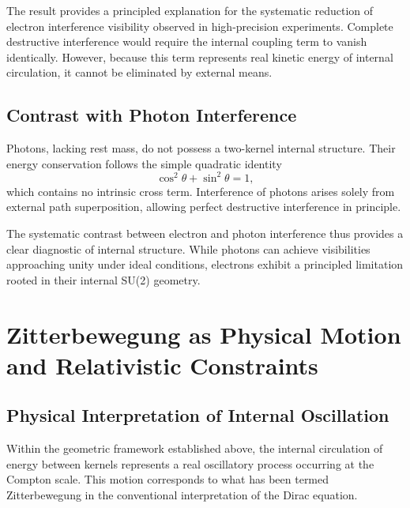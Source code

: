 \documentclass[%
 reprint,
 amsmath,amssymb,
 aps,
 prb,
]{revtex4-2}
\numberwithin{equation}{section}
\begin{document}
The result provides a principled explanation for the systematic reduction of electron interference visibility observed in high-precision experiments. Complete destructive interference would require the internal coupling term to vanish identically. However, because this term represents real kinetic energy of internal circulation, it cannot be eliminated by external means.


\subsection{Contrast with Photon Interference}
\label{subsec:photon_contrast}

Photons, lacking rest mass, do not possess a two-kernel internal structure. Their energy conservation follows the simple quadratic identity
\begin{equation}
\cos^2\theta + \sin^2\theta = 1,
\label{eq:photon_identity}
\end{equation}
which contains no intrinsic cross term. Interference of photons arises solely from external path superposition, allowing perfect destructive interference in principle.

The systematic contrast between electron and photon interference thus provides a clear diagnostic of internal structure. While photons can achieve visibilities approaching unity under ideal conditions, electrons exhibit a principled limitation rooted in their internal SU(2) geometry.


\section{Zitterbewegung as Physical Motion and Relativistic Constraints}
\label{sec:zitterbewegung}

\subsection{Physical Interpretation of Internal Oscillation}
\label{subsec:physical_interpretation}

Within the geometric framework established above, the internal circulation of energy between kernels represents a real oscillatory process occurring at the Compton scale. This motion corresponds to what has been termed Zitterbewegung in the conventional interpretation of the Dirac equation.
\end{document}
